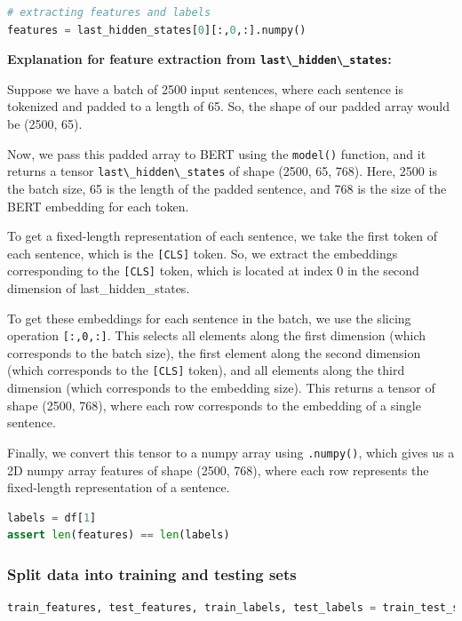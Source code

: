\begin{lstlisting}[language=Python]
# extracting features and labels
features = last_hidden_states[0][:,0,:].numpy()
\end{lstlisting}

\textbf{Explanation for feature extraction from
\lstinline{last\_hidden\_states}:}

Suppose we have a batch of 2500 input sentences, where each sentence is
tokenized and padded to a length of 65. So, the shape of our padded
array would be (2500, 65).

Now, we pass this padded array to BERT using the
\lstinline{model()} function, and it returns a tensor
\lstinline{last\_hidden\_states} of shape (2500, 65, 768).
Here, 2500 is the batch size, 65 is the length of the padded sentence,
and 768 is the size of the BERT embedding for each token.

To get a fixed-length representation of each sentence, we take the first
token of each sentence, which is the \lstinline{[CLS]}
token. So, we extract the embeddings corresponding to the
\lstinline{[CLS]} token, which is located at index 0 in
the second dimension of last\_hidden\_states.

To get these embeddings for each sentence in the batch, we use the
slicing operation \lstinline{[:,0,:]}. This selects all
elements along the first dimension (which corresponds to the batch
size), the first element along the second dimension (which corresponds
to the \lstinline{[CLS]} token), and all elements along
the third dimension (which corresponds to the embedding size). This
returns a tensor of shape (2500, 768), where each row corresponds to the
embedding of a single sentence.

Finally, we convert this tensor to a numpy array using
\lstinline{.numpy()}, which gives us a 2D numpy array
features of shape (2500, 768), where each row represents the
fixed-length representation of a sentence.

\begin{lstlisting}[language=Python]
labels = df[1]
assert len(features) == len(labels)
\end{lstlisting}

\subsubsection{Split data into training and testing
sets}\label{split-data-into-training-and-testing-sets}

\begin{lstlisting}[language=Python]
train_features, test_features, train_labels, test_labels = train_test_split(features, labels)
\end{lstlisting}

